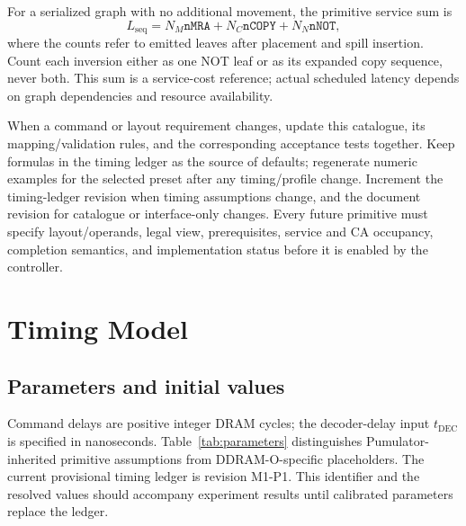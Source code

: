\documentclass[9pt,twocolumn]{extarticle}
\newcommand{\param}[1]{\texttt{#1}}
\newcommand{\timingrevision}{M1-P1}
\begin{document}
For a serialized graph with no additional movement, the primitive service sum
is
\begin{equation*}
 L_{\mathrm{seq}}=N_M\param{nMRA}+N_C\param{nCOPY}+N_N\param{nNOT},
\end{equation*}
where the counts refer to emitted leaves after placement and spill insertion.
Count each inversion either as one NOT leaf or as its expanded copy sequence,
never both. This sum is a service-cost reference; actual scheduled latency
depends on graph dependencies and resource availability.

When a command or layout requirement changes, update this catalogue, its
mapping/validation rules, and the corresponding acceptance tests together.
Keep formulas in the timing ledger as the source of defaults; regenerate
numeric examples for the selected preset after any timing/profile change.
Increment the timing-ledger revision when timing assumptions change, and the
document revision for catalogue or interface-only changes. Every future
primitive must specify layout/operands, legal view, prerequisites, service and
CA occupancy, completion semantics, and implementation status before it is
enabled by the controller.

\section{Timing Model}

\subsection{Parameters and initial values}

Command delays are positive integer DRAM cycles; the decoder-delay input
$t_{\mathrm{DEC}}$ is specified in nanoseconds. Table~\ref{tab:parameters}
distinguishes Pumulator-inherited primitive assumptions from DDRAM-O-specific
placeholders. The current
provisional timing ledger is revision \timingrevision{}. This identifier and
the resolved values should accompany experiment results until calibrated
parameters replace the ledger.
\end{document}
